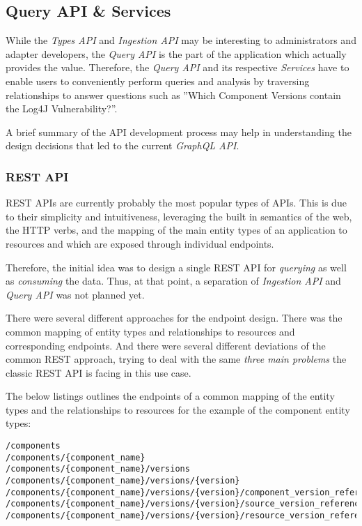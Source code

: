 \subsection{Query API \& Services} \label{sec:Query API & Services}
While the \emph{Types API} and \emph{Ingestion API} may be interesting to administrators and adapter developers, the \emph{Query API} is the part of the application which actually provides the value. Therefore, the \emph{Query API} and its respective \emph{Services} have to enable users to conveniently perform queries and analysis by traversing relationships to answer questions such as ''Which Component Versions contain the Log4J Vulnerability?''.\par
A brief summary of the API development process may help in understanding the design decisions that led to the current \emph{GraphQL API}. 

\subsubsection{REST API}
REST APIs are currently probably the most popular types of APIs. This is due to their simplicity and intuitiveness, leveraging the built in semantics of the web, the HTTP verbs, and the mapping of the main entity types of an application to resources and which are exposed through individual endpoints.\par
Therefore, the initial idea was to design a single REST API for \emph{querying} as well as \emph{consuming} the data. Thus, at that point, a separation of \emph{Ingestion API} and \emph{Query API} was not planned yet.\par 
There were several different approaches for the endpoint design. There was the common mapping of entity types and relationships to resources and corresponding endpoints. And there were several different deviations of the common REST approach, trying to deal with the same \emph{three main problems} the classic REST API is facing in this use case.\par 
The below listings outlines the endpoints of a common mapping of the entity types and the relationships to resources for the example of the component entity types:\\

\begin{lstlisting}[caption=REST API Endpoints, captionpos=b, label=lst:RESTAPIEndpoints]
/components
/components/{component_name}
/components/{component_name}/versions
/components/{component_name}/versions/{version}
/components/{component_name}/versions/{version}/component_version_references
/components/{component_name}/versions/{version}/source_version_references
/components/{component_name}/versions/{version}/resource_version_references
\end{lstlisting}

